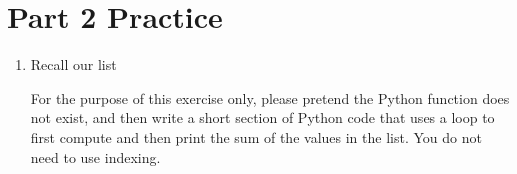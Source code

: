 \documentclass[letterpaper,10pt,english]{sphinxmanual}
\begin{document}
\section{Part 2 Practice}
\label{\detokenize{lecture_notes/lec10_lists2:part-2-practice}}\begin{enumerate}
\item {} 
Recall our list

%
\begin{sphinxVerbatim}[commandchars=\\\{\}]
  \PYG{p}{[}      \PYGZbs{}
        \PYG{p}{]}
\end{sphinxVerbatim}

For the purpose of this exercise only, please pretend the Python
 function does not exist, and then write a short section of
Python code that uses a  loop to first compute and then
print the sum of the values in the  list.  You do not
need to use indexing.

\end{enumerate}
\end{document}
